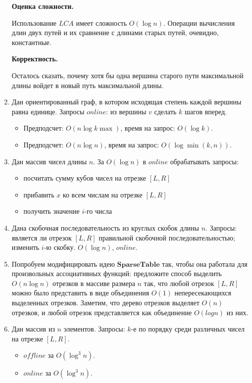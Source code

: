 \begin{enumerate}
	\textbf{Оценка сложности.} 
	
	Использование $LCA$ имеет сложность $O(\log n)$. Операции вычисления длин двух путей и их 
	сравнение с длинами старых путей, очевидно, константные.
	
	\textbf{Корректность.} 
	
	Осталось сказать, почему хотя бы одна вершина старого пути максимальной длины войдет в 
	новый путь максимальной длины. 
	
	\item Дан ориентированный граф, в котором исходящая степень каждой вершины равна единице.
	Запросы $online$: из вершины $v$ сделать $k$ шагов вперед.
	\begin{itemize}
		\item Предподсчет: $O(n \log k\max)$, время на запрос: $O(\log k)$.
		\item Предподсчет: $O(n \log n)$, время на запрос: $O(\log \min(k, n))$.
	\end{itemize}
	
	\item Дан массив чисел длины $n$. За $O(\log n)$ в $online$ обрабатывать запросы:
	\begin{itemize}
		\item посчитать сумму кубов чисел на отрезке $[L, R]$
		\item прибавить $x$ ко всем числам на отрезке $[L, R]$
		\item получить значение $i$-го числа
	\end{itemize}
	
	\item Дана скобочная последовательность из круглых скобок длины $n$. Запросы: является ли 
	отрезок $[L, R]$ правильной скобочной последовательностью; изменить $i$-ю скобку. $O(\log n)$, $online$.
	
	\item Попробуем модифицировать идею $\mathbf{SparseTable}$ так, чтобы она работала для произвольных ассоциативных функций: предложите способ выделить $O(n \log n)$ отрезков в массиве размера $n$ так, что любой отрезок $[L, R]$ можно было представить в виде объединения $O(1)$ непересекающихся выделенных отрезков. Заметим, что дерево отрезков выделяет $O(n)$ отрезков, и любой отрезок представляется как объединение $O(log n)$ из них.
	
	\item Дан массив из $n$ элементов. Запросы: $k$-е по порядку среди различных чисел на отрезке $[L, R]$.
	\begin{itemize}
		\item $offline$ за $O(\log^3 n)$.
		\item $online$ за $O(\log^3 n)$.
	\end{itemize}
	

\end{enumerate}
